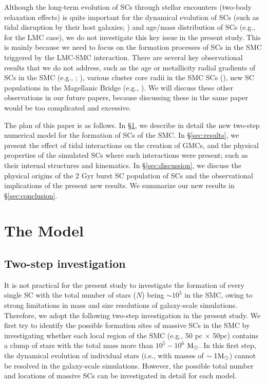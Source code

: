 \documentclass[fleqn,usenatbib]{mnras}
\begin{document}
Although the long-term evolution of SCs through stellar encounters (two-body relaxation effects) is quite important for the dynamical evolution of SCs (such as tidal disruption by their host galaxies; \citealt{K39_Lamers_Gieles_Portegies_Zwart2005}) and age/mass distribution of SCs (e.g., \citealt{K42_Baumgardt_et_al2013} for the LMC case), we do not investigate this key issue in the present study. This is mainly because we need to focus on the formation processes of SCs in the SMC triggered by the LMC-SMC interaction. There are several key observational results that we do not address, such as the age or metallicity radial gradients of SCs in the SMC (e.g., \citealt{K37_Parisi_et_al2015}; \citealt{K40_Dias_et_al2016}),  various cluster core radii in the SMC SCs (\citealt{K38_Santos_et_al2020}),  new SC populations in the Magellanic Bridge (e.g., \citealt{K41_Bica_et_al2020}). We will discuss these other observations in our future papers, because discussing these in the same paper would be too complicated and excessive.
  

The plan of this paper is as follows. In \S \ref{sec:the_model}, we describe in detail the new two-step numerical model for the formation of SCs of the SMC. In \S \ref{sec:results}, we present the effect of tidal interactions on the creation of GMCs, and the physical properties of the simulated SCs where such interactions were present; such
as their internal structures and kinematics. In \S \ref{sec:discussion}, we discuss the physical origins of the 2 Gyr burst SC population of SCs and the observational implications of the present new results. We summarize our new results in \S \ref{sec:conclusion}. 
%
\section{The Model}
\label{sec:the_model}
\subsection{Two-step investigation}
It is not practical for the present study to investigate the formation of every single SC with the total number of stars ($N$) being ${\sim}10^5$ in the SMC, owing to strong limitations in mass and size resolutions of galaxy-scale simulations. Therefore, we adopt the following two-step investigation in the present study. 
We first try to identify the possible formation sites of massive SCs in the SMC by investigating whether each local region of the SMC (e.g., 50 pc $\times$ 50pc) contains a clump of stars with the total mass more than $10^5-10^6$ ${\rm M}_{\odot}$.
In this first step, the dynamical evolution of individual stars (i.e., with masses of $\sim 1 {\rm M}_{\odot}$) cannot be resolved in
the galaxy-scale simulations. However, the possible total number and locations of massive SCs can be investigated in detail for each model.
\end{document}

